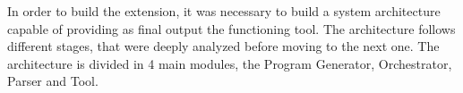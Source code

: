 In order to build the extension, it was necessary to build a system architecture capable of providing as final output the functioning tool. The architecture follows different stages, that were deeply analyzed before moving to the next one.
The architecture is divided in 4 main modules, the Program Generator, Orchestrator, Parser and Tool.











%
%
%